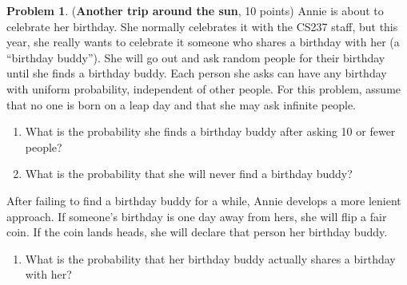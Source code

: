 \documentclass[letterpaper,11pt]{article}
\theoremstyle{plain}%
\theoremstyle{definition}
\newtheorem{problem}{Problem}
\theoremstyle{plain}%
\begin{document}
\begin{problem}(\textbf{Another trip around the sun}, 10 points) Annie is about to celebrate her birthday. She normally celebrates it with the CS237 staff, but this year, she really wants to celebrate it someone who shares a birthday with her (a ``birthday buddy''). She will go out and ask random people for their birthday until she finds a birthday buddy. Each person she asks can have any birthday with uniform probability, independent of other people. For this problem, assume that no one is born on a leap day and that she may ask infinite people.

    \begin{enumerate}[label=(\alph*)]
        \item What is the probability she finds a birthday buddy after asking 10 or fewer people?
        \item What is the probability that she will never find a birthday buddy?
    \end{enumerate}
    After failing to find a birthday buddy for a while, Annie develops a more lenient approach. If someone's birthday is one day away from hers, she will flip a fair coin. If the coin lands heads, she will declare that person her birthday buddy.
    \begin{enumerate}[resume,label=(\alph*)]
        \item What is the probability that her birthday buddy actually shares a birthday with her?
    \end{enumerate}
\end{problem}
\end{document}
